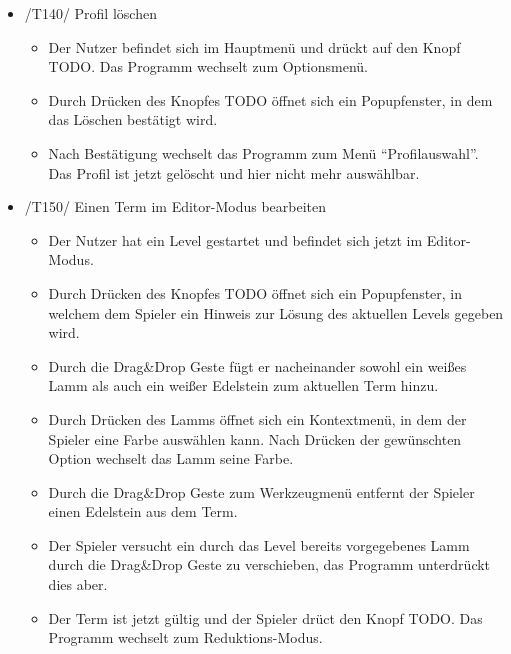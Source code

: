 \begin{itemize}
\item /T140/ Profil löschen
\begin{itemize}
\item Der Nutzer befindet sich im Hauptmenü und drückt auf den Knopf TODO. Das Programm wechselt zum Optionsmenü.
\item Durch Drücken des Knopfes TODO öffnet sich ein Popupfenster, in dem das Löschen bestätigt wird.
\item Nach Bestätigung wechselt das Programm zum Menü "`Profilauswahl"'. Das Profil ist jetzt gelöscht und hier nicht mehr auswählbar.
\end{itemize}

\item /T150/ Einen Term im Editor-Modus bearbeiten
\begin{itemize}
\item Der Nutzer hat ein Level gestartet und befindet sich jetzt im Editor-Modus.
\item Durch Drücken des Knopfes TODO öffnet sich ein Popupfenster, in welchem dem Spieler ein Hinweis zur Lösung des aktuellen Levels gegeben wird.
\item Durch die Drag\&Drop Geste fügt er nacheinander sowohl ein weißes Lamm als auch ein weißer Edelstein zum aktuellen Term hinzu.
\item Durch Drücken des Lamms öffnet sich ein Kontextmenü, in dem der Spieler eine Farbe auswählen kann. Nach Drücken der gewünschten Option wechselt das Lamm seine Farbe.
\item Durch die Drag\&Drop Geste zum Werkzeugmenü entfernt der Spieler einen Edelstein aus dem Term.
\item Der Spieler versucht ein durch das Level bereits vorgegebenes Lamm durch die Drag\&Drop Geste zu verschieben, das Programm unterdrückt dies aber.
\item Der Term ist jetzt gültig und der Spieler drüct den Knopf TODO. Das Programm wechselt zum Reduktions-Modus.
\end{itemize}


\end{itemize}
